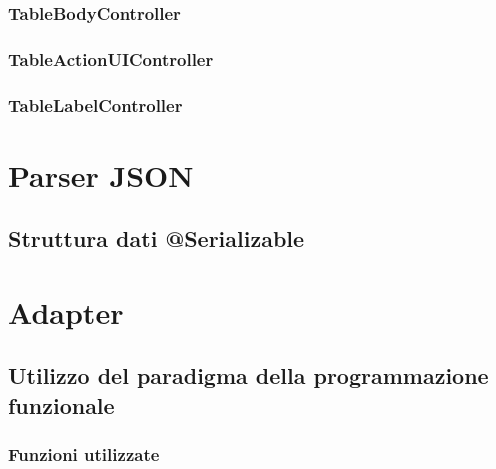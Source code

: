 \subsubsection{TableBodyController}
\subsubsection{TableActionUIController}
\subsubsection{TableLabelController}

\section{Parser JSON}
\subsection{Struttura dati @Serializable}

\section{Adapter}
\subsection{Utilizzo del paradigma della programmazione funzionale}
\subsubsection{Funzioni utilizzate}





